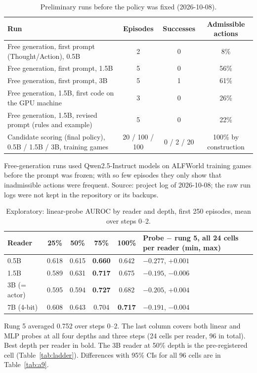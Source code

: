 \documentclass[11pt]{article}
\begin{document}
\begin{table}[h]
\centering\small
\caption{Preliminary runs before the policy was fixed (2026-10-08).}\label{tab:a5}
\begin{tabularx}{\linewidth}{@{}Lccc@{}}
\toprule
Run & Episodes & Successes & Admissible actions \\
\midrule
Free generation, first prompt (Thought/Action), 0.5B & 2 & 0 & 8\% \\
Free generation, first prompt, 1.5B & 5 & 0 & 56\% \\
Free generation, first prompt, 3B & 5 & 1 & 61\% \\
Free generation, 1.5B, first code on the GPU machine & 3 & 0 & 26\% \\
Free generation, 1.5B, revised prompt (rules and example) & 5 & 0 & 22\% \\
Candidate scoring (final policy), 0.5B / 1.5B / 3B, training games & 20 / 100 / 100 & 0 / 2 / 20 & 100\% by construction \\
\bottomrule
\end{tabularx}
\par\smallskip\raggedright\footnotesize
Free-generation runs used Qwen2.5-Instruct models on ALFWorld training games before the prompt was frozen; with so few episodes they only show that inadmissible actions were frequent. Source: project log of 2026-10-08; the raw run logs were not kept in the repository or its backups.
\end{table}

\begin{table}[h]
\centering\small
\caption{Exploratory: linear-probe AUROC by reader and depth, first 250 episodes, mean over steps 0--2.}\label{tab:a6}
\begin{tabularx}{\linewidth}{@{}lccccL@{}}
\toprule
Reader & 25\% & 50\% & 75\% & 100\% & Probe $-$ rung 5, all 24 cells per reader (min, max) \\
\midrule
0.5B & 0.618 & 0.615 & \textbf{0.660} & 0.642 & $-0.277$, $+0.001$ \\
1.5B & 0.589 & 0.631 & \textbf{0.717} & 0.675 & $-0.195$, $-0.006$ \\
3B (= actor) & 0.595 & 0.594 & \textbf{0.727} & 0.682 & $-0.205$, $+0.004$ \\
7B (4-bit) & 0.608 & 0.643 & 0.704 & \textbf{0.717} & $-0.191$, $-0.004$ \\
\bottomrule
\end{tabularx}
\par\smallskip\raggedright\footnotesize
Rung 5 averaged 0.752 over steps 0--2. The last column covers both linear and MLP probes at all four depths and three steps (24 cells per reader, 96 in total). Best depth per reader in bold. The 3B reader at 50\% depth is the pre-registered cell (Table~\ref{tab:ladder}). Differences with 95\% CIs for all 96 cells are in Table~\ref{tab:a9}.
\end{table}
\end{document}
